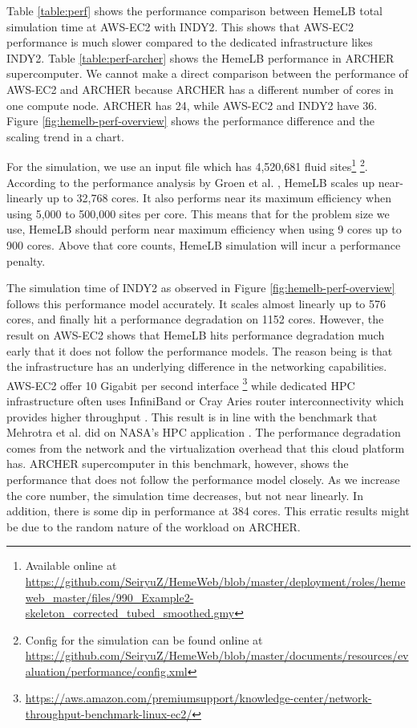 \vspace{0.5cm}


Table \ref{table:perf} shows the performance comparison between HemeLB total simulation time at AWS-EC2 with INDY2. This shows that AWS-EC2 performance is much slower compared to the dedicated infrastructure likes INDY2. Table \ref{table:perf-archer} shows the HemeLB performance in ARCHER supercomputer. We cannot make a direct comparison between the performance of AWS-EC2 and ARCHER because ARCHER has a different number of cores in one compute node. ARCHER has 24, while AWS-EC2 and INDY2 have 36. Figure \ref{fig:hemelb-perf-overview} shows the performance difference and the scaling trend in a chart. 


For the simulation, we use an input file which has 4,520,681 fluid sites\footnote{Available online at \url{https://github.com/SeiryuZ/HemeWeb/blob/master/deployment/roles/hemeweb_master/files/990_Example2-skeleton_corrected_tubed_smoothed.gmy}}  \footnote{Config for the simulation can be found online at \url{https://github.com/SeiryuZ/HemeWeb/blob/master/documents/resources/evaluation/performance/config.xml}}. According to the performance analysis by Groen et al. \citep{groen2013analysing}, HemeLB scales up near-linearly up to 32,768 cores. It also performs near its maximum efficiency when using 5,000 to 500,000 sites per core. This means that for the problem size we use, HemeLB should perform near maximum efficiency when using 9 cores up to 900 cores. Above that core counts, HemeLB simulation will incur a performance penalty.

The simulation time of INDY2 as observed in Figure \ref{fig:hemelb-perf-overview} follows this performance model accurately. It scales almost linearly up to 576 cores, and finally hit a performance degradation on 1152 cores. However, the result on AWS-EC2 shows that HemeLB hits performance degradation much early that it does not follow the performance models. The reason being is that the infrastructure has an underlying difference in the networking capabilities. AWS-EC2 offer 10 Gigabit per second interface \footnote{\url{https://aws.amazon.com/premiumsupport/knowledge-center/network-throughput-benchmark-linux-ec2/}} while dedicated HPC infrastructure often uses InfiniBand or Cray Aries router interconnectivity which provides higher throughput \cite{Quan:2014aa}. This result is in line with the benchmark that Mehrotra et al. did on NASA's HPC application \citep{mehrotra2012performance}. The performance degradation comes from the network and the virtualization overhead that this cloud platform has.  ARCHER supercomputer in this benchmark, however, shows the performance that does not follow the performance model closely. As we increase the core number, the simulation time decreases, but not near linearly. In addition, there is some dip in performance at 384 cores. This erratic results might be due to the random nature of the workload on ARCHER. 


